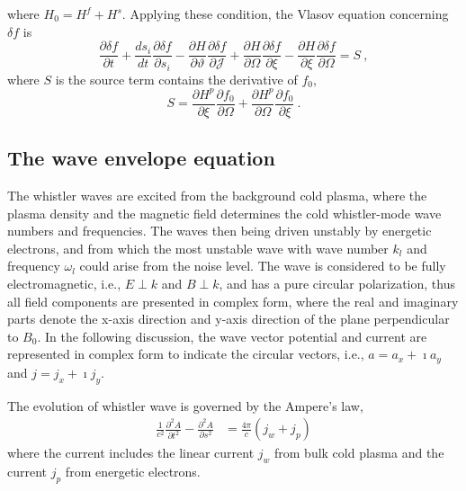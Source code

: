 where $H_0 = H^f + H^s$.
Applying these condition, the Vlasov equation concerning $\delta f$ is
\begin{equation}\label{eq.deltaf}
    \frac{\partial \delta f}{\partial t}+ \frac{d s_{i}}{d t} \frac{\partial \delta f}{\partial s_{i}} - \frac{\partial H}{\partial \vartheta} \frac{\partial \delta f}{\partial \mathcal{J}} + \frac{\partial H}{\partial \Omega} \frac{\partial \delta f}{\partial \xi} - \frac{\partial H}{\partial \xi} \frac{\partial \delta f}{\partial \Omega} = S~,
\end{equation}
where $S$ is the source term contains the derivative of $f_0$,
\begin{equation}
    S = \frac{\partial H^p}{\partial \xi} \frac{\partial f_0}{\partial \Omega}  + \frac{\partial H^p}{\partial \Omega} \frac{\partial f_0}{\partial \xi}~.
\end{equation}
\fi

\subsection{The wave envelope equation}
The whistler waves are excited from the background cold plasma, where the plasma density and the magnetic field determines the cold whistler-mode wave numbers and frequencies. The waves then being driven unstably by energetic electrons, and from which the most unstable wave with wave number $k_l$ and frequency $\omega_l$ could arise from the noise level. The wave is considered to be fully electromagnetic, i.e., $E \perp k$ and $B \perp k$, and has a pure circular polarization, thus all field components are presented in complex form, where the real and imaginary parts denote the x-axis direction and y-axis direction of the plane perpendicular to $B_0$. In the following discussion, the wave vector potential and current are represented in complex form to indicate the circular vectors, i.e., $a = a_x + \imath a_y$ and $j = j_x + \imath j_y$.

The evolution of whistler wave is governed by the Ampere's law, 
\begin{equation}
    \begin{aligned}
        \label{eq.wavemid_1}
        \frac{1}{c^{2}} \frac{\partial^{2} A}{\partial t^{2}}-\frac{\partial^{2} A}{\partial s^{2}} & =\frac{4 \pi}{c}\left(j_w+j_p\right)
    \end{aligned}
\end{equation}
where the current includes the linear current $j_w$ from bulk cold plasma and the current $j_p$ from energetic electrons.

